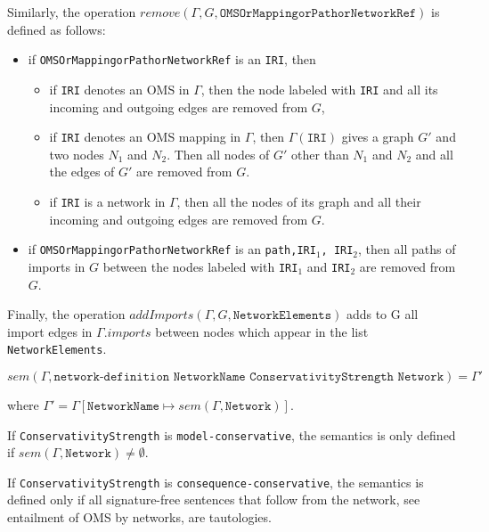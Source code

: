 \documentclass[10pt,fleqn,final]{scrreprt}
\newcommand*{\syntax}[1]{\texttt{#1}}
\newcommand{\semdom}[1]{
\begin{center}
\fbox{$#1$}
\end{center}
}
\newenvironment{definitions}[0]{\medskip }{}
\begin{document}
\begin{definitions}
 
Similarly, the operation $remove(\Gamma, G, \syntax{OMSOrMappingorPathorNetworkRef})$ is defined as follows:

\begin{itemize}

\item if \syntax{OMSOrMappingorPathorNetworkRef} is an \syntax{IRI}, then

 \begin{itemize}
    \item if \syntax{IRI} denotes an OMS in $\Gamma$, then the node labeled with \syntax{IRI} and all its incoming and outgoing
                edges are removed from $G$,
   \item  if \syntax{IRI} denotes an OMS mapping in $\Gamma$, then  
   $\Gamma(\syntax{IRI})$ gives a graph $G'$ and two nodes 
   $N_1$ and $N_2$. Then all nodes of $G'$ other than $N_1$ and
   $N_2$ and all the edges of $G'$ are removed from $G$.
   \item if \syntax{IRI} is a network in $\Gamma$, then all the nodes of its graph and all their incoming and outgoing edges are removed 
               from $G$.
 \end{itemize}
 
 \item if \syntax{OMSOrMappingorPathorNetworkRef} is an \syntax{path,IRI$_1$, IRI$_2$},
 then all paths of imports in $G$ between the nodes labeled with 
 \syntax{IRI}$_1$ and \syntax{IRI}$_2$ are removed from $G$.

\end{itemize}

Finally, the operation $addImports(\Gamma, G, \syntax{NetworkElements})$ adds to G
all import edges in $\Gamma.imports$ between nodes which appear 
in the list \syntax{NetworkElements}. 


\semdom{sem(\Gamma, \syntax{NetworkDefinition}) = \Gamma'}

$$sem(\Gamma, \syntax{network-definition NetworkName  ConservativityStrength  Network}) = \Gamma'$$

\noindent where $\Gamma' = \Gamma[\syntax{NetworkName} \mapsto sem(\Gamma, \syntax{Network})]$.

If \syntax{ConservativityStrength} is \syntax{model-conservative}, the semantics is only
defined if $sem(\Gamma,\syntax{Network})\not=\emptyset$.

If \syntax{ConservativityStrength} is \syntax{consequence-conservative}, the semantics is 
 defined only if all signature-free sentences that follow from the network, see entailment of OMS by networks, are tautologies.


\end{definitions}
\end{document}

